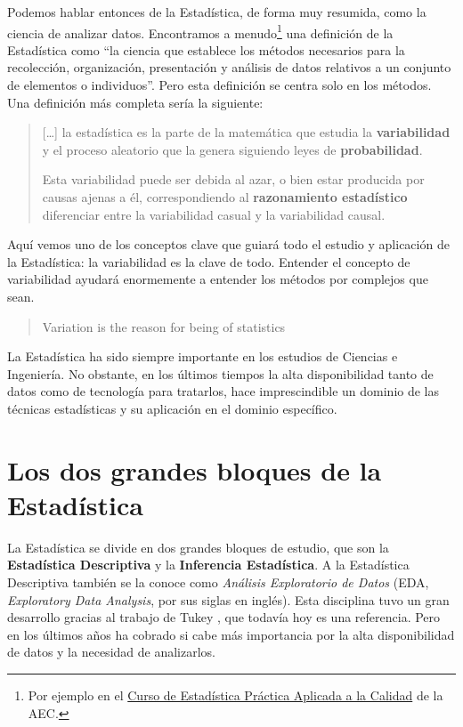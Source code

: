 \documentclass[
]{book}
\begin{document}
Podemos hablar entonces de la Estadística, de forma muy resumida,
como la ciencia de analizar datos. Encontramos a menudo\footnote{Por ejemplo en el \href{https://www.aec.es/formacion/catalogo-cursos/estadistica-practica-aplicada-la-calidad/}{Curso de Estadística Práctica Aplicada a la Calidad} de la AEC.} una definición
de la Estadística como ``la ciencia que establece los métodos necesarios para la recolección, organización, presentación y análisis de datos relativos a
un conjunto de elementos o individuos''. Pero esta definición se centra solo
en los métodos. Una definición más completa sería la siguiente:

\begin{quote}
{[}\ldots{]} la estadística es la parte de la matemática que estudia la \textbf{variabilidad} y el proceso aleatorio que la genera siguiendo leyes de \textbf{probabilidad}.

Esta variabilidad puede ser debida al azar, o bien estar producida por causas ajenas a él, correspondiendo al \textbf{razonamiento estadístico} diferenciar entre la variabilidad casual y la variabilidad causal.

\citet{oca}
\end{quote}

Aquí vemos uno de los conceptos clave que guiará todo el estudio y aplicación de
la Estadística: la variabilidad es la clave de todo. Entender el concepto de
variabilidad ayudará enormemente a entender los métodos por complejos que sean.

\begin{quote}
Variation is the reason for being of statistics

\citet{cano2012sixsigma}
\end{quote}

La Estadística ha sido siempre importante en los estudios de Ciencias e
Ingeniería. No obstante, en los últimos tiempos la alta disponibilidad
tanto de datos como de tecnología para tratarlos, hace imprescindible
un dominio de las técnicas estadísticas y su aplicación en el dominio
específico.

\hypertarget{los-dos-grandes-bloques-de-la-estaduxedstica}{%
\section{Los dos grandes bloques de la Estadística}\label{los-dos-grandes-bloques-de-la-estaduxedstica}}

La Estadística se divide en dos grandes bloques de estudio, que son
la \textbf{Estadística Descriptiva} y la \textbf{Inferencia Estadística}. A la
Estadística Descriptiva también se la conoce como \emph{Análisis Exploratorio de Datos}
(EDA, \emph{Exploratory Data Analysis}, por sus siglas en inglés).
Esta disciplina tuvo un gran desarrollo gracias al trabajo de Tukey \citep{tukey1977exploratory},
que todavía hoy es una referencia. Pero en los últimos años ha cobrado si cabe
más importancia por la alta disponibilidad de datos y la necesidad de analizarlos.
\end{document}
